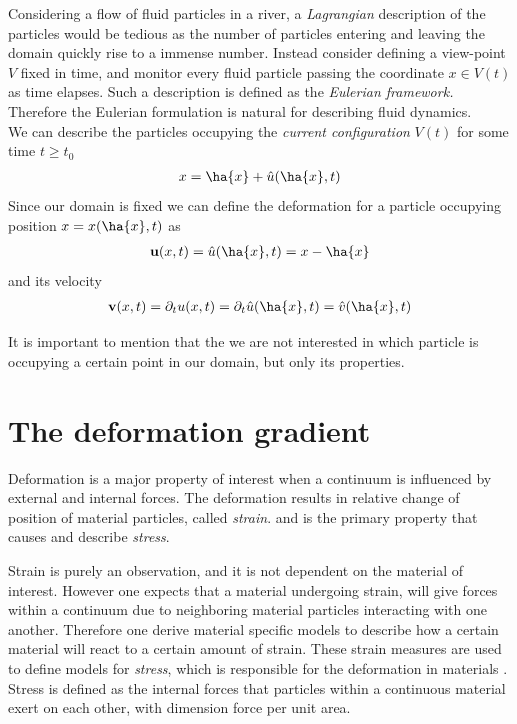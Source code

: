Considering a flow of fluid particles in a river, a \textit{Lagrangian} description of the particles would be tedious as the number of particles entering and leaving the domain quickly rise to a immense number. 
Instead consider defining a view-point $V$ fixed in time, and monitor every fluid particle passing the coordinate $x \in V(t)$ as time elapses. Such a description is defined as the \textit{Eulerian framework.} 
Therefore the Eulerian formulation is natural for describing fluid dynamics. \\
We can describe the particles occupying the \textit{current configuration} $V(t)$ for some time $t \geq t_0$ 
\begin{align*}
x = \ha{x} + \hat{u}(\ha{x}, t)	
\end{align*}
Since our domain is fixed we can define the deformation for a particle 
occupying position $x = x(\ha{x},t)$ as
\begin{align*}
\textbf{u}(x, t) = \hat{u}(\ha{x}, t) = x - \ha{x}	\\
\end{align*}
and its velocity
\begin{align*}
\textbf{v}(x,t) = \partial_t u(x,t) = \partial_t \hat{u}(\ha{x},t) = \hat{v}(\ha{x},t)
\end{align*}

It is important to mention that the we are not interested in which particle is occupying a certain point in our domain, but only its properties. 

\section{The deformation gradient}
Deformation is a major property of interest when a continuum is influenced by external and internal forces.  The deformation results in relative change of position of material particles, called \textit{strain}. and is the primary property that causes and describe \textit{stress}.

Strain is purely an observation, and it is not dependent on the material of interest. However one expects that a material undergoing strain, will give  forces within a continuum due to neighboring material particles interacting with one another. Therefore one derive material specific models to describe how a certain material will react to a certain amount of strain.
These strain measures are used to define models for \textit{stress}, which is responsible for the deformation in materials \cite{Holzapfel2000}. Stress is defined as the internal forces that particles within a continuous material exert on each other, with dimension force per unit area.  \\

